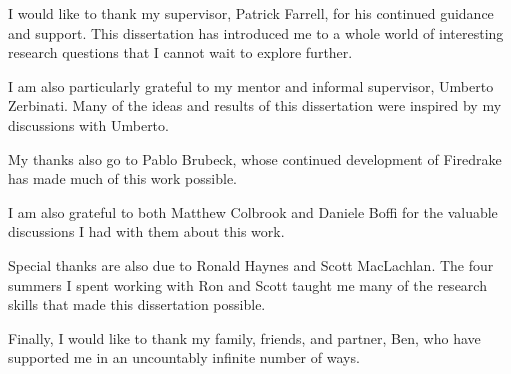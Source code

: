 \begin{acknowledgements} 
\setlength{\parskip}{1em}
I would like to thank my supervisor, Patrick Farrell, for his continued guidance and support. This dissertation has introduced me to a whole world of interesting research questions that I cannot wait to explore further.


I am also particularly grateful to my mentor and informal supervisor, Umberto Zerbinati. Many of the ideas and results of this dissertation were inspired by my discussions with Umberto. 


My thanks also go to Pablo Brubeck, whose continued development of Firedrake has made much of this work possible.


I am also grateful to both Matthew Colbrook and Daniele Boffi for the valuable discussions I had with them about this work.


Special thanks are also due to Ronald Haynes and Scott MacLachlan. The four summers I spent working with Ron and Scott taught me many of the research skills that made this dissertation possible. 


Finally, I would like to thank my family, friends, and partner, Ben, who have supported me in an uncountably infinite number of ways. 

\end{acknowledgements}
